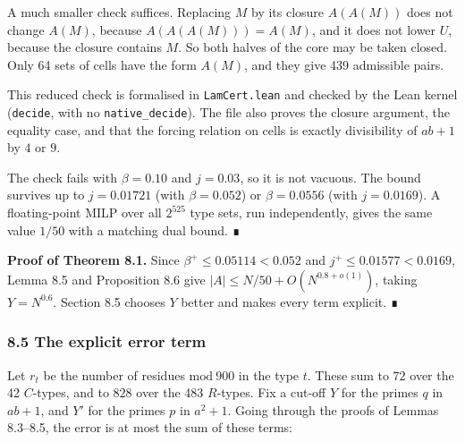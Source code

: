 \documentclass[
  11pt,
]{article}
\begin{document}
A much smaller check suffices. Replacing \(M\) by its closure
\(A(A(M))\) does not change \(A(M)\), because \(A(A(A(M))) = A(M)\), and
it does not lower \(U\), because the closure contains \(M\). So both
halves of the core may be taken closed. Only 64 sets of cells have the
form \(A(M)\), and they give 439 admissible pairs.

This reduced check is formalised in \texttt{LamCert.lean} and checked by
the Lean kernel (\texttt{decide}, with no \texttt{native\_decide}). The
file also proves the closure argument, the equality case, and that the
forcing relation on cells is exactly divisibility of \(ab + 1\) by \(4\)
or \(9\).

The check fails with \(\beta = 0.10\) and \(j = 0.03\), so it is not
vacuous. The bound survives up to \(j = 0.01721\) (with
\(\beta = 0.052\)) or \(\beta = 0.0556\) (with \(j = 0.0169\)). A
floating-point MILP over all \(2^{525}\) type sets, run independently,
gives the same value \(1/50\) with a matching dual bound. ∎

\textbf{Proof of Theorem 8.1.} Since \(\beta^{+} \le 0.05114 < 0.052\)
and \(j^{+} \le 0.01577 < 0.0169\), Lemma 8.5 and Proposition 8.6 give
\(|A| \le N/50 + O(N^{0.8+o(1)})\), taking \(Y = N^{0.6}\). Section 8.5
chooses \(Y\) better and makes every term explicit. ∎

\subsubsection{8.5 The explicit error term}

Let \(r_t\) be the number of residues \(\mathrm{mod}\ 900\) in the type
\(t\). These sum to \(72\) over the 42 \(C\)-types, and to \(828\) over
the 483 \(R\)-types. Fix a cut-off \(Y\) for the primes \(q\) in
\(ab + 1\), and \(Y'\) for the primes \(p\) in \(a^2 + 1\). Going
through the proofs of Lemmas 8.3--8.5, the error is at most the sum of
these terms:
\end{document}
